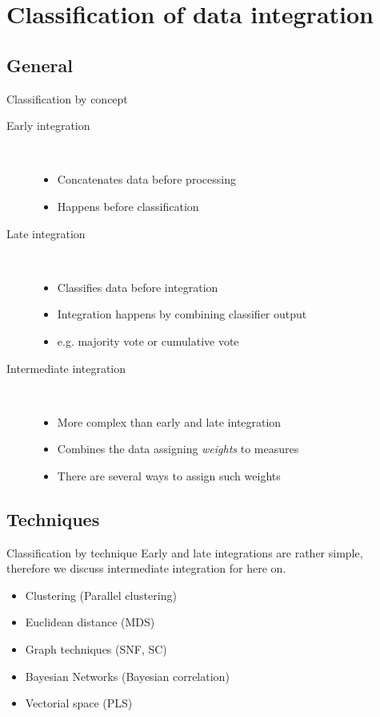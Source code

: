 \documentclass[hyperref={colorlinks=true}]{beamer}
\begin{document}
\section{Classification of data integration}

\subsection{General}
\begin{frame}{Classification by concept}
  \begin{description}
    \item[Early integration] \hfill \\
    \pause
    \begin{itemize}
      \item Concatenates data before processing
      \item Happens before classification
    \end{itemize}
    \pause
    \item[Late integration] \hfill \\
    \pause
    \begin{itemize}
      \item Classifies data before integration
      \item Integration happens by combining classifier output
      \item e.g. majority vote or cumulative vote
    \end{itemize}
    \pause
    \item[Intermediate integration] \hfill \\
    \pause
    \begin{itemize}
      \item More complex than early and late integration
      \item Combines the data assigning \emph{weights} to measures
      \item There are several ways to assign such weights
    \end{itemize}
  \end{description}
\end{frame}

\subsection{Techniques}
\begin{frame}{Classification by technique}
  Early and late integrations are rather simple, therefore we discuss
  intermediate integration for here on.
  \pause
  \begin{itemize}
    \item Clustering (Parallel clustering)
    \item Euclidean distance (MDS)
    \item Graph techniques (SNF, SC)
    \item Bayesian Networks (Bayesian correlation)
    \item Vectorial space (PLS)
  \end{itemize}
\end{frame}
\end{document}
